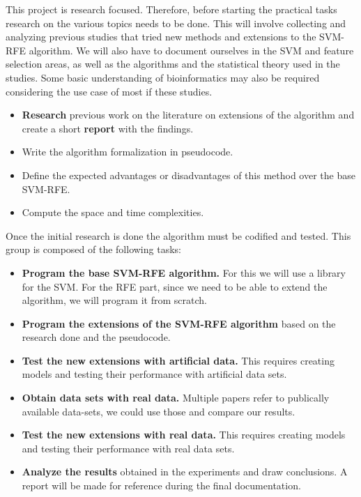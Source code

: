 This project is research focused. Therefore, before starting the practical tasks research on the various topics needs to be done. This will involve collecting and analyzing previous studies that tried new methods and extensions to the SVM-RFE algorithm. We will also have to document ourselves in the SVM and feature selection areas, as well as the algorithms and the statistical theory used in the studies. Some basic understanding of bioinformatics may also be required considering the use case of most if these studies.

\begin{itemize}
    \item \textbf{Research} previous work on the literature on extensions of the algorithm and create a short \textbf{report} with the findings.
    \item Write the algorithm formalization in pseudocode.
    \item Define the expected advantages or disadvantages of this method over the base SVM-RFE.
    \item Compute the space and time complexities.
\end{itemize}

Once the initial research is done the algorithm must be codified and tested. This group is composed of the following tasks:

\begin{itemize}
    \item \textbf{Program the base SVM-RFE algorithm.} For this we will use a library for the SVM. For the RFE part, since we need to be able to extend the algorithm, we will program it from scratch.
    \item \textbf{Program the extensions of the SVM-RFE algorithm} based on the research done and the pseudocode.
    \item \textbf{Test the new extensions with artificial data.} This requires creating models and testing their performance with artificial data sets.
    \item \textbf{Obtain data sets with real data.} Multiple papers refer to publically available data-sets, we could use those and compare our results.
    \item \textbf{Test the new extensions with real data.} This requires creating models and testing their performance with real data sets.
    \item \textbf{Analyze the results} obtained in the experiments and draw conclusions. A report will be made for reference during the final documentation.
\end{itemize}


